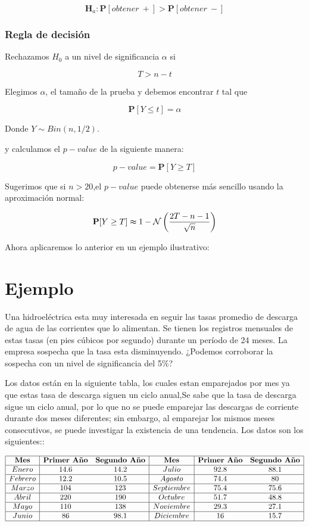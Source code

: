 \documentclass[
  a4paper,
  oneside,
  openany]{book}
\begin{document}
\[\textbf{H}_a: \mathbf{P}[obtener\ +] > \mathbf{P}[obtener\ -]\]

\hypertarget{regla-de-decisiuxf3n-12}{%
\subsubsection*{Regla de decisión}\label{regla-de-decisiuxf3n-12}}


Rechazamos \(H_0\) a un nivel de significancia \(\alpha\) si

\[T > n-t \]

Elegimos \(\alpha\), el tamaño de la prueba y debemos encontrar \(t\) tal que

\[\mathbf{P}[Y \leq t]=\alpha\]

Donde \(Y \sim Bin (n,1/2)\).

y calculamos el \(p-value\) de la siguiente manera:

\[p-value=\mathbf{P}[Y\geq T]\]

Sugerimos que si \(n > 20\),el \(p-value\) puede obtenerse más sencillo usando la aproximación normal:

\[\mathbf{P}[Y\geq T] \thickapprox 1- \mathcal{N} \left(\frac{2T-n-1}{\sqrt{n}}\right)\]

Ahora aplicaremos lo anterior en un ejemplo ilustrativo:

\hypertarget{ejemplo-4}{%
\section{Ejemplo}\label{ejemplo-4}}

Una hidroeléctrica esta muy interesada en seguir las tasas promedio de descarga de agua de las corrientes que lo alimentan. Se tienen los registros mensuales de estas tasas (en pies cúbicos por segundo) durante un período de 24 meses.
La empresa sospecha que la tasa esta disminuyendo. ¿Podemos corroborar la sospecha con un nivel de significancia del 5\%?

Los datos están en la siguiente tabla, los cuales estan emparejados por mes ya que estas tasa de descarga siguen un ciclo anual,Se sabe que la tasa de descarga sigue un ciclo anual, por lo que no se puede emparejar las descargas de corriente durante dos meses diferentes; sin embargo, al emparejar los mismos meses consecutivos, se puede investigar la existencia de una tendencia. Los datos son los siguientes::

\[
\begin{array}{|c| c c|c| c c|} 
\hline
\textbf{Mes} & \textbf{Primer Año} & \textbf{Segundo Año} & \textbf{Mes} & \textbf{Primer Año} & \textbf{Segundo Año}\\
\hline
Enero & 14.6 & 14.2 & Julio & 92.8 & 88.1 \\
\hline
Febrero&12.2&10.5&Agosto&74.4&80 \\
\hline
Marzo&104&123&Septiembre&75.4&75.6 \\
\hline
Abril&220&190&Octubre&51.7&48.8 \\
\hline
Mayo&110&138&Noviembre&29.3&27.1 \\
\hline
Junio&86&98.1&Diciembre&16&15.7 \\
\hline
\end{array}
\]
\end{document}
